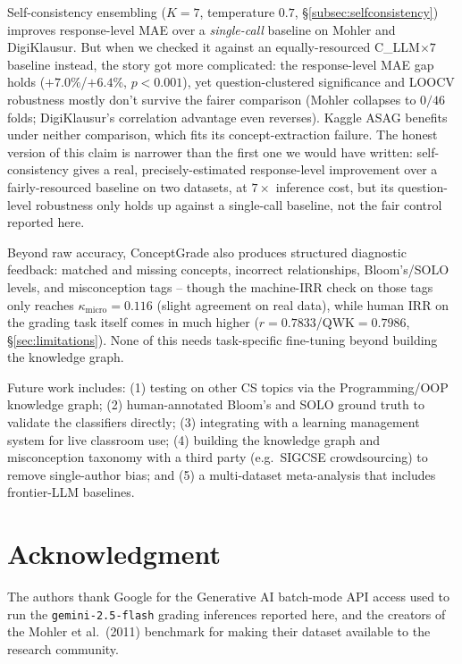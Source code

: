 \documentclass[conference]{IEEEtran}
\begin{document}
Self-consistency ensembling ($K{=}7$, temperature $0.7$,
\S\ref{subsec:selfconsistency}) improves response-level MAE over a
\emph{single-call} baseline on Mohler and DigiKlausur. But when we
checked it against an equally-resourced C\_LLM$\times7$ baseline
instead, the story got more complicated: the response-level MAE gap
holds ($+7.0\%$/$+6.4\%$, $p<0.001$), yet question-clustered
significance and LOOCV robustness mostly don't survive the fairer
comparison (Mohler collapses to $0/46$ folds; DigiKlausur's
correlation advantage even reverses). Kaggle ASAG benefits under
neither comparison, which fits its concept-extraction failure. The
honest version of this claim is narrower than the first one we would
have written: self-consistency gives a real, precisely-estimated
response-level improvement over a fairly-resourced baseline on two
datasets, at $7\times$ inference cost, but its question-level
robustness only holds up against a single-call baseline, not the fair
control reported here.

Beyond raw accuracy, ConceptGrade also produces structured diagnostic
feedback: matched and missing concepts, incorrect relationships,
Bloom's/SOLO levels, and misconception tags -- though the machine-IRR
check on those tags only reaches $\kappa_{\text{micro}}=0.116$
(slight agreement on real data), while human IRR on the grading task
itself comes in much higher ($r=0.7833$/QWK$=0.7986$,
\S\ref{sec:limitations}). None of this needs task-specific fine-tuning
beyond building the knowledge graph.

Future work includes: (1) testing on other CS topics via the
Programming/OOP knowledge graph; (2) human-annotated Bloom's and SOLO
ground truth to validate the classifiers directly; (3) integrating with
a learning management system for live classroom use; (4) building the
knowledge graph and misconception taxonomy with a third party (e.g.\
SIGCSE crowdsourcing) to remove single-author bias; and (5) a
multi-dataset meta-analysis that includes frontier-LLM baselines.

\section*{Acknowledgment}

The authors thank Google for the Generative AI batch-mode API access used
to run the \texttt{gemini-2.5-flash} grading inferences reported here, and
the creators of the Mohler et al.\ (2011) benchmark for making their
dataset available to the research community.
\end{document}
